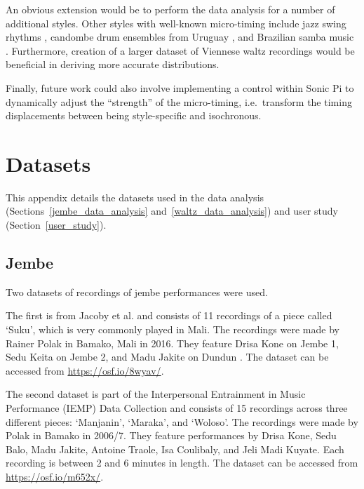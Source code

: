 \documentclass[12pt,twoside,openright]{report}
\begin{document}
An obvious extension would be to perform the data analysis for a number of
additional styles. Other styles with well-known micro-timing include jazz swing
rhythms \cite{dittmar2018}, candombe drum ensembles from Uruguay \cite{jure2016,fuentes2019}, and Brazilian samba music \cite{naveda2011,fuentes2019}. Furthermore,
creation of a larger dataset of Viennese waltz recordings would be beneficial in
deriving more accurate distributions.

Finally, future work could also involve implementing a control within Sonic Pi
to dynamically adjust the ``strength'' of the micro-timing, i.e.\ transform the
timing displacements between being style-specific and isochronous.





\printbibliography[heading=bibintoc]





\appendix





\chapter{Datasets} \label{appendix_datasets}

This appendix details the datasets used in the data analysis (Sections~\ref{jembe_data_analysis} and~\ref{waltz_data_analysis}) and user study (Section~\ref{user_study}).



\section*{Jembe} \label{appendix_datasets_jembe}

Two datasets of recordings of jembe performances were used.

The first is from Jacoby et al. \cite{jacoby2021} and consists of 11 recordings of a piece called `Suku', which is very commonly played in Mali. The recordings were made by Rainer Polak in Bamako, Mali in 2016. They feature Drisa Kone on Jembe 1, Sedu Keita on Jembe 2, and Madu Jakite on Dundun \cite{jacoby2021supp}. The dataset can be accessed from \url{https://osf.io/8wyav/}.

The second dataset is part of the Interpersonal Entrainment in Music Performance (IEMP)
Data Collection \cite{polak2020,clayton2021} and consists of 15 recordings across three different pieces: `Manjanin', `Maraka', and `Woloso'. The recordings were made by Polak in Bamako in 2006/7. They feature performances by Drisa Kone, Sedu Balo, Madu Jakite, Antoine Traole, Isa Coulibaly, and Jeli Madi Kuyate. Each recording is between 2 and 6 minutes in length. The dataset can be accessed from \url{https://osf.io/m652x/}.
\end{document}

